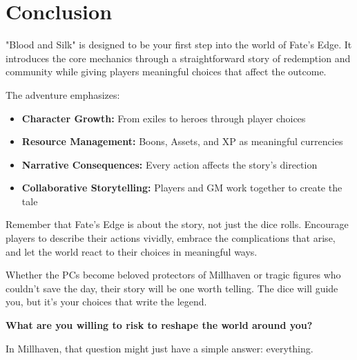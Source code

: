 \documentclass[11pt]{article}
\begin{document}
\section{Conclusion}

"Blood and Silk" is designed to be your first step into the world of Fate's Edge. It introduces the core mechanics through a straightforward story of redemption and community while giving players meaningful choices that affect the outcome.

The adventure emphasizes:
\begin{itemize}
\item \textbf{Character Growth:} From exiles to heroes through player choices
\item \textbf{Resource Management:} Boons, Assets, and XP as meaningful currencies
\item \textbf{Narrative Consequences:} Every action affects the story's direction
\item \textbf{Collaborative Storytelling:} Players and GM work together to create the tale
\end{itemize}

Remember that Fate's Edge is about the story, not just the dice rolls. Encourage players to describe their actions vividly, embrace the complications that arise, and let the world react to their choices in meaningful ways.

Whether the PCs become beloved protectors of Millhaven or tragic figures who couldn't save the day, their story will be one worth telling. The dice will guide you, but it's your choices that write the legend.

\begin{center}
\textbf{What are you willing to risk to reshape the world around you?}
\end{center}

In Millhaven, that question might just have a simple answer: everything.
\end{document}
